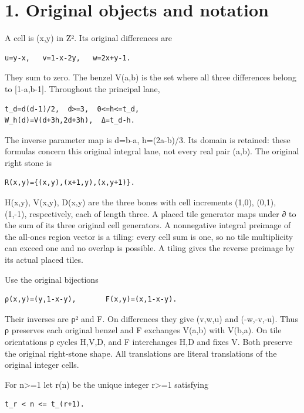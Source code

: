 \documentclass[
  10pt,
]{scrreprt}
\begin{document}
\section{1. Original objects and notation}\label{edition-10-section-1}

A cell is (x,y) in Z². Its original differences are

\begin{verbatim}
u=y-x,   v=1-x-2y,   w=2x+y-1.
\end{verbatim}

They sum to zero. The benzel V(a,b) is the set where all three
differences belong to {[}1-a,b-1{]}. Throughout the principal lane,

\begin{verbatim}
t_d=d(d-1)/2,  d>=3,  0<=h<=t_d,
W_h(d)=V(d+3h,2d+3h),  Δ=t_d-h.
\end{verbatim}

The inverse parameter map is d=b-a, h=(2a-b)/3. Its domain is retained:
these formulas concern this original integral lane, not every real pair
(a,b). The original right stone is

\begin{verbatim}
R(x,y)={(x,y),(x+1,y),(x,y+1)}.
\end{verbatim}

H(x,y), V(x,y), D(x,y) are the three bones with cell increments (1,0),
(0,1), (1,-1), respectively, each of length three. A placed tile
generator maps under ∂ to the sum of its three original cell generators.
A nonnegative integral preimage of the all-ones region vector is a
tiling: every cell sum is one, so no tile multiplicity can exceed one
and no overlap is possible. A tiling gives the reverse preimage by its
actual placed tiles.

Use the original bijections

\begin{verbatim}
ρ(x,y)=(y,1-x-y),       F(x,y)=(x,1-x-y).
\end{verbatim}

Their inverses are ρ² and F. On differences they give (v,w,u) and
(-w,-v,-u). Thus ρ preserves each original benzel and F exchanges V(a,b)
with V(b,a). On tile orientations ρ cycles H,V,D, and F interchanges H,D
and fixes V. Both preserve the original right-stone shape. All
translations are literal translations of the original integer cells.

For n\textgreater=1 let r(n) be the unique integer r\textgreater=1
satisfying

\begin{verbatim}
t_r < n <= t_(r+1).
\end{verbatim}
\end{document}
